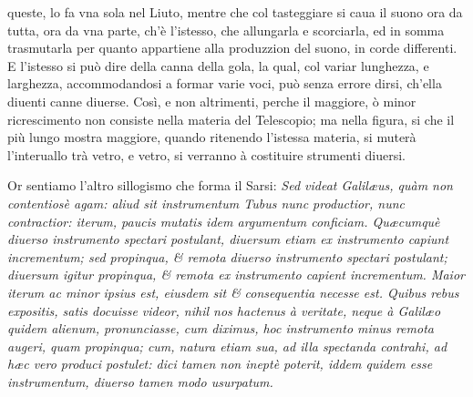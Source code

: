 \documentclass[11pt,twoside,openany]{book}
\begin{document}
queste, lo fa vna sola nel Liuto, mentre che col tasteggiare si caua il suono ora da tutta, ora da vna parte, ch'è l'istesso, che allungarla e scorciarla, ed in somma trasmutarla per quanto appartiene alla produzzion del suono, in corde differenti. E l'istesso si può dire della canna della gola, la qual, col variar lunghezza, e larghezza, accommodandosi a formar varie voci, può senza errore dirsi, ch'ella diuenti canne diuerse. Così, e non altrimenti, perche il maggiore, ò minor ricrescimento non consiste nella materia del Telescopio; ma nella figura, si che il più lungo mostra maggiore, quando ritenendo l'istessa materia, si muterà l'interuallo trà vetro, e vetro, si verranno à costituire strumenti diuersi.



\par\bigskip\noindent{}\enspace Or sentiamo l'altro sillogismo che forma il Sarsi: \textit{Sed videat Galilæus, quàm non contentiosè agam: aliud sit instrumentum Tubus nunc productior, nunc contractior: iterum, paucis mutatis idem argumentum conficiam. Quæcumquè diuerso instrumento spectari postulant, diuersum etiam ex instrumento capiunt incrementum; sed propinqua, \& remota diuerso instrumento spectari postulant; diuersum igitur propinqua, \& remota ex instrumento capient incrementum. Maior iterum ac minor ipsius est, eiusdem sit \& }\textit{consequentia necesse est. Quibus rebus expositis, satis docuisse videor, nihil nos hactenus à veritate, neque à Galilæo quidem alienum, pronunciasse, cum diximus, hoc instrumento minus remota augeri, quam propinqua; cum, natura etiam sua, ad illa spectanda contrahi, ad hæc vero produci postulet: dici tamen non ineptè poterit, iddem quidem esse instrumentum, diuerso tamen modo usurpatum.}
\end{document}
